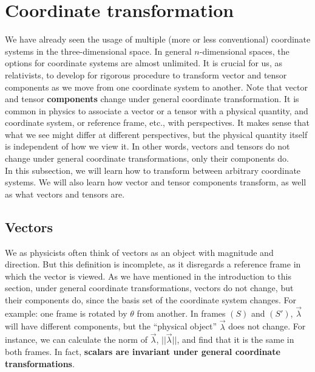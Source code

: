 \documentclass{book}
\theoremstyle{definition}
\begin{document}
\section{Coordinate transformation}
We have already seen the usage of multiple (more or less conventional) coordinate systems in the three-dimensional space. In general $n$-dimensional spaces, the options for coordinate systems are almost unlimited. It is crucial for us, as relativists, to develop for rigorous procedure to transform vector and tensor components as we move from one coordinate system to another. Note that vector and tensor \textbf{components} change under general coordinate transformation. It is common in physics to associate a vector or a tensor with a physical quantity, and coordinate system, or reference frame, etc., with perspectives. It makes sense that what we see might differ at different perspectives, but the physical quantity itself is independent of how we view it. In other words, vectors and tensors do not change under general coordinate transformations, only their components do.\\

In this subsection, we will learn how to transform between arbitrary coordinate systems. We will also learn how vector and tensor components transform, as well as what vectors and tensors are.
\subsection{Vectors}
We as physicists often think of vectors as an object with magnitude and direction. But this definition is incomplete, as it disregards a reference frame in which the vector is viewed. As we have mentioned in the introduction to this section, under general coordinate transformations, vectors do not change, but their components do, since the basis set of the coordinate system changes. For example: one frame is rotated by $\theta$ from another. In frames $(S)$ and $(S')$, $\vec{\lambda}$ will have different components, but the ``physical object'' $\vec{\lambda}$ does not change. For instance, we can calculate the norm of $\vec{\lambda}$, $\vert\vert \vec{\lambda} \vert\vert$, and find that it is the same in both frames. In fact, \textbf{scalars are invariant under general coordinate transformations}.\\
\end{document}
